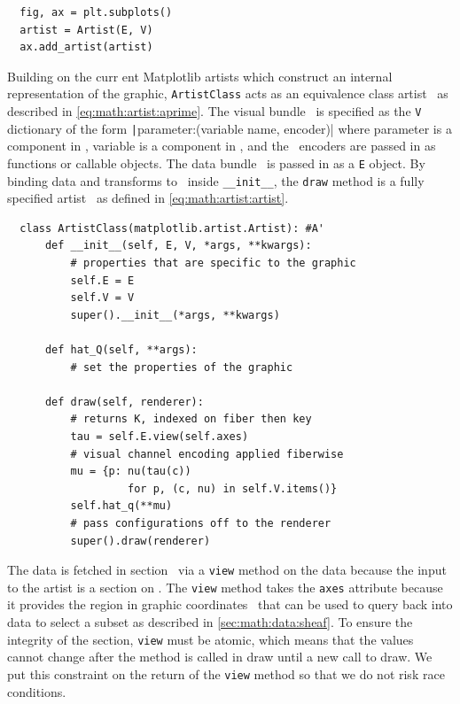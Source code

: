 \documentclass[../main.tex]{subfiles}
\begin{document}
\begin{verbatim}
  fig, ax = plt.subplots()
  artist = Artist(E, V)
  ax.add_artist(artist)
\end{verbatim}
Building on the curr
ent Matplotlib artists which construct an internal representation of the graphic, \texttt{ArtistClass} acts as an equivalence class artist \vartisteq\ as described in \autoref{eq:math:artist:aprime}. The visual bundle \vtotal\ is specified as the \texttt{V} dictionary of the form \texttt|{parameter:(variable name, encoder)}| where parameter is a component in \vfiber, variable is a component in \dfiber, and the \vchannel\ encoders are passed in as functions or callable objects. The data bundle \dtotal\ is passed in as a \texttt{E} object. By binding data and transforms to \vartisteq\ inside \texttt{__init__}, the \texttt{draw} method is a fully specified artist \vartist\ as defined in \autoref{eq:math:artist:artist}.
\begin{verbatim}
  class ArtistClass(matplotlib.artist.Artist): #A'
      def __init__(self, E, V, *args, **kwargs):
          # properties that are specific to the graphic
          self.E = E
          self.V = V 
          super().__init__(*args, **kwargs)
  
      def hat_Q(self, **args): 
          # set the properties of the graphic
  
      def draw(self, renderer):
          # returns K, indexed on fiber then key 
          tau = self.E.view(self.axes) 
          # visual channel encoding applied fiberwise 
          mu = {p: nu(tau(c))
                   for p, (c, nu) in self.V.items()} 
          self.hat_q(**mu)
          # pass configurations off to the renderer
          super().draw(renderer)
  \end{verbatim}
 The data is fetched in section \dsection\ via a \texttt{view} method on the data because the input to the artist is a section on \dtotal. The \texttt{view} method takes the \texttt{axes} attribute because it provides the region in graphic coordinates \gbase\ that can be used to query back into data to select a subset as described in \autoref{sec:math:data:sheaf}. To ensure the integrity of the section, \texttt{view} must be atomic, which means that the values cannot change after the method is called in draw until a new call to draw\cite{ullmanFirstCourseDatabase2008}. We put this constraint on the return of the \texttt{view} method so that we do not risk race conditions. 
 
\end{document}
